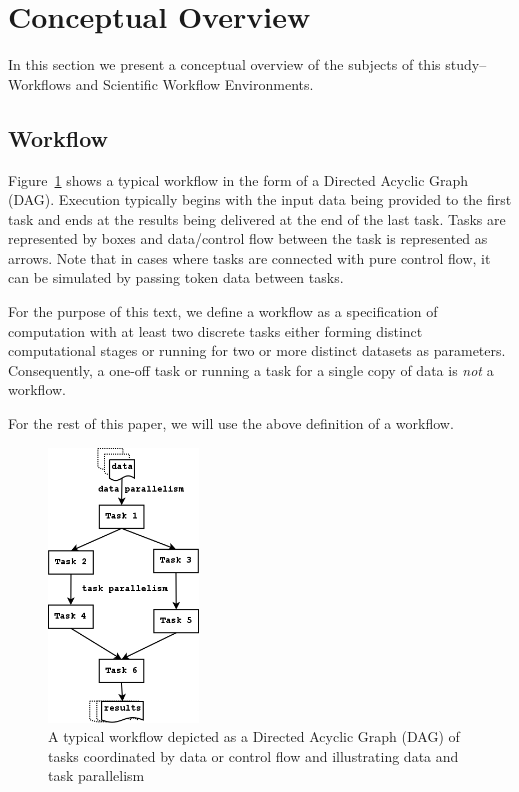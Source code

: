 \section{Conceptual Overview}
In this section we present a conceptual overview of the subjects of this
study--Workflows and Scientific Workflow Environments.

\subsection{Workflow}
Figure~\ref{fig:wf} shows a typical workflow in the form of a Directed Acyclic
Graph (DAG). Execution typically begins with the input data being provided to
the first task and ends at the results being delivered at the end of the last
task. Tasks are represented by boxes and data/control flow between the task is
represented as arrows. Note that in cases where tasks are connected with pure
control flow, it can be simulated by passing token data between tasks.

For the purpose of this text, we define a workflow as a specification of
computation with at least two discrete tasks either forming distinct
computational stages or running for two or more distinct datasets as
parameters. Consequently, a one-off task or running a task for a single copy of
data is \emph{not} a workflow.

For the rest of this paper, we will use the above definition of a workflow.
%

\begin{figure}[htb]
\begin{center}
\includegraphics[width=4cm]{figures/workflow}
\caption{A typical workflow depicted as a Directed Acyclic Graph (DAG) of tasks coordinated by data or control flow and illustrating data and task parallelism}
\label{fig:wf}
\end{center}
\end{figure}
%

